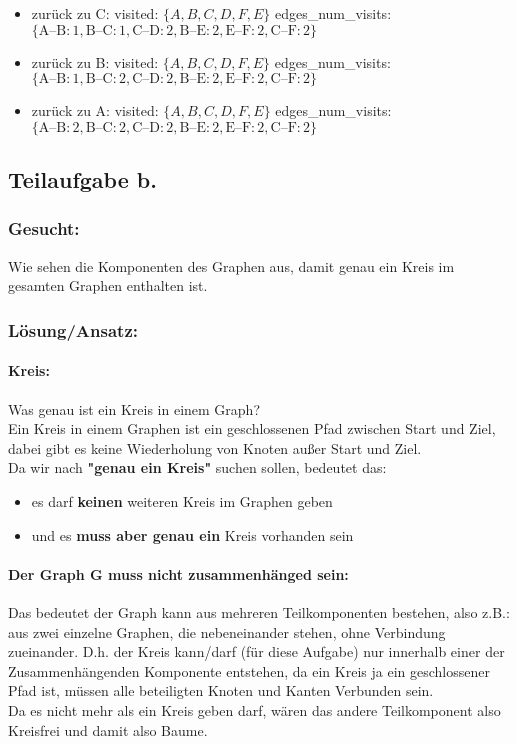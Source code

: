 \begin{itemize}
	\item zurück zu C: visited: $\{A, B, C, D, F, E\}$  
	edges\_num\_visits: $\{\text{A--B}: 1, \text{B--C}: 1, \text{C--D}: 2, \text{B--E}: 2, \text{E--F}: 2, \text{C--F}: 2\}$
	
	\item zurück zu B: visited: $\{A, B, C, D, F, E\}$  
	edges\_num\_visits: $\{\text{A--B}: 1, \text{B--C}: 2, \text{C--D}: 2, \text{B--E}: 2, \text{E--F}: 2, \text{C--F}: 2\}$
	
	\item zurück zu A: visited: $\{A, B, C, D, F, E\}$  
	edges\_num\_visits: $\{\text{A--B}: 2, \text{B--C}: 2, \text{C--D}: 2, \text{B--E}: 2, \text{E--F}: 2, \text{C--F}: 2\}$
\end{itemize}

\subsection{Teilaufgabe b.}
\subsubsection{Gesucht:}

Wie sehen die Komponenten des Graphen aus, damit genau ein Kreis im gesamten Graphen enthalten ist.

\subsubsection{Lösung/Ansatz:}

\paragraph{Kreis:} Was genau ist ein Kreis in einem Graph?\\
Ein Kreis in einem Graphen ist ein geschlossenen Pfad zwischen Start und Ziel, dabei gibt es keine Wiederholung von Knoten außer Start und Ziel.\\
Da wir nach \textbf{"genau ein Kreis"} suchen sollen, bedeutet das:
\begin{itemize}
	\item es darf \textbf{keinen} weiteren Kreis im Graphen geben
	\item und es \textbf{muss aber genau ein} Kreis vorhanden sein
\end{itemize}

\paragraph{Der Graph G muss nicht zusammenhänged sein:} Das bedeutet der Graph kann aus mehreren Teilkomponenten bestehen, also z.B.: aus zwei einzelne Graphen, die nebeneinander stehen, ohne Verbindung zueinander. D.h. der Kreis kann/darf (für diese Aufgabe) nur innerhalb einer der Zusammenhängenden Komponente entstehen, da ein Kreis ja ein geschlossener Pfad ist, müssen alle beteiligten Knoten und Kanten Verbunden sein.\\
Da es nicht mehr als ein Kreis geben darf, wären das andere Teilkomponent also Kreisfrei und damit also Baume.

